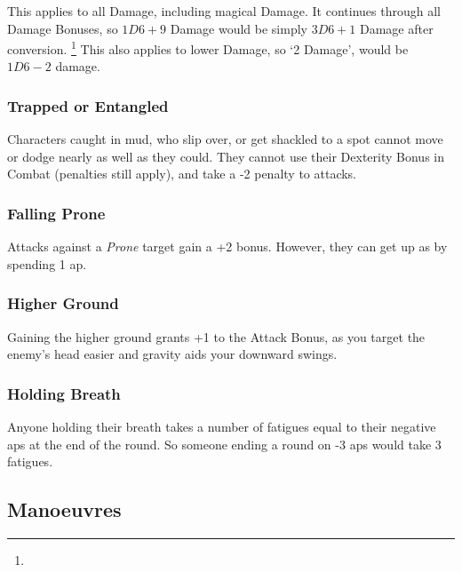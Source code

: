\begin{multicols}{2}
This applies to all Damage, including magical Damage.
It continues through all Damage Bonuses, so $1D6+9$ Damage would be simply $3D6+1$ Damage after conversion.%
\footnote{\stackingDamageChart}
This also applies to lower Damage, so `2 Damage', would be $1D6-2$ damage.

\subsubsection[Trapped/ Entangled: Character cannot use their Dexterity Bonus, and takes -2 Attack penalty]{Trapped or Entangled}
\label{trapped}
\label{entangled}

Characters caught in mud, who slip over, or get shackled to a spot cannot move or dodge nearly as well as they could.
They cannot use their Dexterity Bonus in Combat (penalties still apply), and take a -2 penalty to attacks.

\subsubsection[Falling Prone: -2 penalty when on the ground]{Falling Prone}
\label{prone}

Attacks against a \textit{Prone} target gain a +2 bonus.
However, they can get up as by spending 1 \gls{ap}.

\subsubsection[+1 to attack]{Higher Ground}

Gaining the higher ground grants +1 to the Attack Bonus, as you target the enemy's head easier and gravity aids your downward swings.

\subsubsection[Holding Breath: 1 \glsentrytext{fatigue} per negative \glsentrytext{ap} at the end of the round]{Holding Breath}

Anyone holding their breath takes a number of \glspl{fatigue} equal to their negative \glspl{ap} at the end of the round.
So someone ending a round on -3 \glspl{ap} would take 3 \glspl{fatigue}.

\subsection{Manoeuvres}


\end{multicols}
